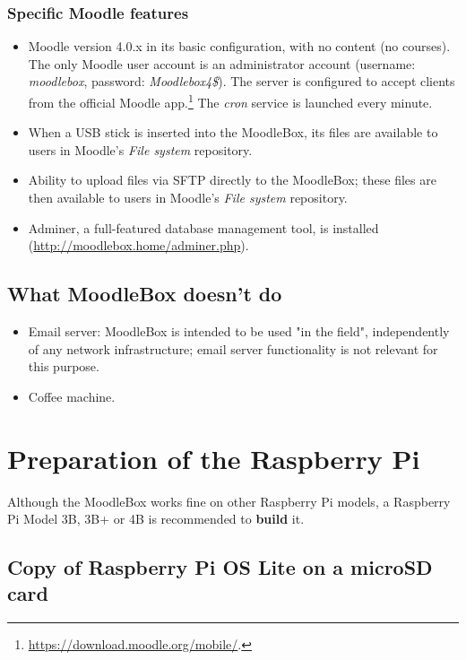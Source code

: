 \documentclass[12pt]{article}
\begin{document}
\subsubsection{Specific Moodle features}
\begin{itemize}
\item Moodle version 4.0.x in its basic configuration, with no content (no courses).
The only Moodle user account is an administrator account (username: \emph{moodlebox}, password: \emph{Moodlebox4\$}).
The server is configured to accept clients from the official Moodle app.\footnote{\url{https://download.moodle.org/mobile/}.} The \textsl{cron} service is launched every minute.
\item When a USB stick is inserted into the MoodleBox, its files are available to users in Moodle's \textsl{File system} repository.
\item Ability to upload files via SFTP directly to the MoodleBox; these files are then available to users in Moodle's \textsl{File system} repository.
\item Adminer, a full-featured database management tool, is installed (\url{http://moodlebox.home/adminer.php}).
\end{itemize}

\subsection{What MoodleBox doesn't do}

\begin{itemize}
\item Email server: MoodleBox is intended to be used "in the field", independently of any network infrastructure; email server functionality is not relevant for this purpose.
\item Coffee machine.
\end{itemize}

\section{Preparation of the Raspberry Pi}

Although the MoodleBox works fine on other Raspberry Pi models, a Raspberry Pi Model 3B, 3B+ or 4B is recommended to \textbf{build} it.

\subsection{Copy of Raspberry Pi OS Lite on a microSD card}
\end{document}
